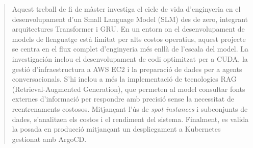 \vspace*{\fill}
\begin{abstract}
    Aquest treball de fi de màster investiga el cicle de vida d'enginyeria en el desenvolupament d'un Small Language Model (SLM) des de zero, integrant arquitectures Transformer i GRU. En un entorn on el desenvolupament de models de llenguatge està limitat per alts costos operatius, aquest projecte se centra en el flux complet d'enginyeria més enllà de l'escala del model. La investigación inclou el desenvolupament de codi optimitzat per a CUDA, la gestió d'infraestructura a AWS EC2 i la preparació de dades per a agents conversacionals. S'hi inclou a més la implementació de tecnologies RAG (Retrieval-Augmented Generation), que permeten al model consultar fonts externes d'informació per respondre amb precisió sense la necessitat de reentrenaments costosos. Mitjançant l'ús de \textit{spot instances} i subconjunts de dades, s'analitzen els costos i el rendiment del sistema. Finalment, es valida la posada en producció mitjançant un despliegament a Kubernetes gestionat amb ArgoCD.
\end{abstract}
\vspace*{\fill}
\clearpage

